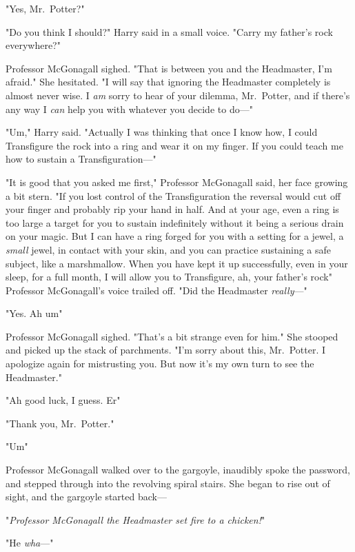 "Yes, Mr.~Potter?"

"Do you think I should?" Harry said in a small voice. "Carry my father's rock
everywhere?"

Professor McGonagall sighed. "That is between you and the Headmaster, I'm
afraid." She hesitated. "I will say that ignoring the Headmaster completely is
almost never wise. I \emph{am} sorry to hear of your dilemma, Mr.~Potter, and
if there's any way I \emph{can} help you with whatever you decide to do\mbox{---}"

"Um," Harry said. "Actually I was thinking that once I know how, I could
Transfigure the rock into a ring and wear it on my finger. If you could teach
me how to sustain a Transfiguration\mbox{---}"

"It is good that you asked me first," Professor McGonagall said, her face
growing a bit stern. "If you lost control of the Transfiguration the reversal
would cut off your finger and probably rip your hand in half. And at your age,
even a ring is too large a target for you to sustain indefinitely without it
being a serious drain on your magic. But I can have a ring forged for you with
a setting for a jewel, a \emph{small} jewel, in contact with your skin, and you
can practice sustaining a safe subject, like a marshmallow. When you have kept
it up successfully, even in your sleep, for a full month, I will allow you to
Transfigure, ah, your father's rock{\el}" Professor McGonagall's voice
trailed off. "Did the Headmaster \emph{really}\mbox{---}"

"Yes. Ah{\el} um{\el}"

Professor McGonagall sighed. "That's a bit strange even for him." She stooped
and picked up the stack of parchments. "I'm sorry about this, Mr.~Potter. I
apologize again for mistrusting you. But now it's my own turn to see the
Headmaster."

"Ah{\el} good luck, I guess. Er{\el}"

"Thank you, Mr.~Potter."

"Um{\el}"

Professor McGonagall walked over to the gargoyle, inaudibly spoke the password,
and stepped through into the revolving spiral stairs. She began to rise out of
sight, and the gargoyle started back\mbox{---}

"\emph{Professor McGonagall the Headmaster set fire to a chicken!}"

"He \emph{wha}\mbox{---}"

